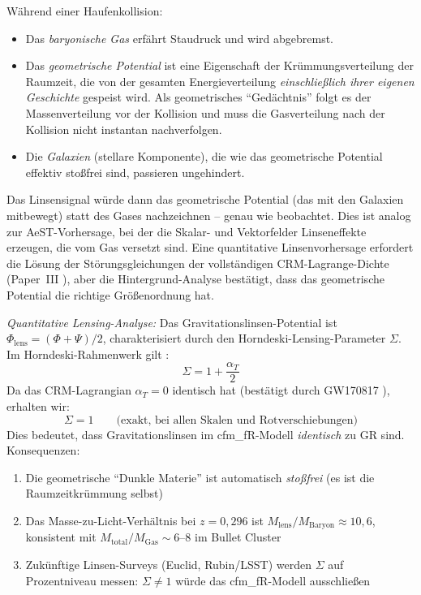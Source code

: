 \documentclass[aps,prd,twocolumn,superscriptaddress,nofootinbib]{revtex4-2}
\begin{document}
W\"ahrend einer Haufenkollision:
\begin{itemize}
\item Das \textit{baryonische Gas} erf\"ahrt Staudruck und wird abgebremst.
\item Das \textit{geometrische Potential} ist eine Eigenschaft der Kr\"ummungsverteilung der Raumzeit, die von der gesamten Energieverteilung \textit{einschließlich ihrer eigenen Geschichte} gespeist wird. Als geometrisches "`Ged\"achtnis"' folgt es der Massenverteilung vor der Kollision und muss die Gasverteilung nach der Kollision nicht instantan nachverfolgen.
\item Die \textit{Galaxien} (stellare Komponente), die wie das geometrische Potential effektiv stoßfrei sind, passieren ungehindert.
\end{itemize}

Das Linsensignal w\"urde dann das geometrische Potential (das mit den Galaxien mitbewegt) statt des Gases nachzeichnen -- genau wie beobachtet. Dies ist analog zur AeST-Vorhersage, bei der die Skalar- und Vektorfelder Linseneffekte erzeugen, die vom Gas versetzt sind. Eine quantitative Linsenvorhersage erfordert die L\"osung der St\"orungsgleichungen der vollst\"andigen CRM-Lagrange-Dichte (Paper~III \cite{Geiger2026c}), aber die Hintergrund-Analyse best\"atigt, dass das geometrische Potential die richtige Größenordnung hat.

\textit{Quantitative Lensing-Analyse:} Das Gravitationslinsen-Potential ist $\Phi_{\mathrm{lens}} = (\Phi + \Psi)/2$, charakterisiert durch den Horndeski-Lensing-Parameter $\Sigma$. Im Horndeski-Rahmenwerk gilt \cite{Amendola2018}:
\begin{equation}
\Sigma = 1 + \frac{\alpha_T}{2}
\end{equation}
Da das CRM-Lagrangian $\alpha_T = 0$ identisch hat (best\"atigt durch GW170817 \cite{Abbott2017gw}), erhalten wir:
\begin{equation}
{\Sigma = 1 \qquad \text{(exakt, bei allen Skalen und Rotverschiebungen)}}
\end{equation}
Dies bedeutet, dass Gravitationslinsen im cfm\_fR-Modell \textit{identisch} zu GR sind. Konsequenzen:
\begin{enumerate}
\item Die geometrische "`Dunkle Materie"' ist automatisch \textit{stoßfrei} (es ist die Raumzeitkr\"ummung selbst)
\item Das Masse-zu-Licht-Verh\"altnis bei $z = 0{,}296$ ist $M_{\mathrm{lens}}/M_{\mathrm{Baryon}} \approx 10{,}6$, konsistent mit $M_{\mathrm{total}}/M_{\mathrm{Gas}} \sim 6$--$8$ im Bullet Cluster \cite{Clowe2006}
\item Zuk\"unftige Linsen-Surveys (Euclid, Rubin/LSST) werden $\Sigma$ auf Prozentniveau messen: $\Sigma \neq 1$ w\"urde das cfm\_fR-Modell ausschließen
\end{enumerate}
\end{document}
